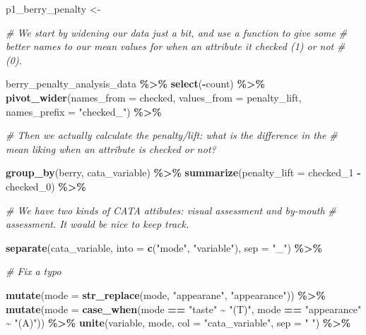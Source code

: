 \documentclass[
]{book}
\newenvironment{Shaded}{\begin{snugshade}}{\end{snugshade}}
\newcommand{\AttributeTok}[1]{\textcolor[rgb]{0.13,0.29,0.53}{#1}}
\newcommand{\CommentTok}[1]{\textcolor[rgb]{0.56,0.35,0.01}{\textit{#1}}}
\newcommand{\FunctionTok}[1]{\textcolor[rgb]{0.13,0.29,0.53}{\textbf{#1}}}
\newcommand{\NormalTok}[1]{#1}
\newcommand{\OtherTok}[1]{\textcolor[rgb]{0.56,0.35,0.01}{#1}}
\newcommand{\SpecialCharTok}[1]{\textcolor[rgb]{0.81,0.36,0.00}{\textbf{#1}}}
\newcommand{\StringTok}[1]{\textcolor[rgb]{0.31,0.60,0.02}{#1}}
\begin{document}
\begin{Shaded}
\begin{Highlighting}[]
\NormalTok{p1\_berry\_penalty }\OtherTok{\textless{}{-}} 
  
  \CommentTok{\# We start by widening our data just a bit, and use a function to give some}
  \CommentTok{\# better names to our mean values for when an attribute it checked (1) or not}
  \CommentTok{\# (0).}
  
\NormalTok{  berry\_penalty\_analysis\_data }\SpecialCharTok{\%\textgreater{}\%}
  \FunctionTok{select}\NormalTok{(}\SpecialCharTok{{-}}\NormalTok{count) }\SpecialCharTok{\%\textgreater{}\%}
  \FunctionTok{pivot\_wider}\NormalTok{(}\AttributeTok{names\_from =}\NormalTok{ checked,}
              \AttributeTok{values\_from =}\NormalTok{ penalty\_lift,}
              \AttributeTok{names\_prefix =} \StringTok{"checked\_"}\NormalTok{) }\SpecialCharTok{\%\textgreater{}\%}
  
  \CommentTok{\# Then we actually calculate the penalty/lift: what is the difference in the}
  \CommentTok{\# mean liking when an attribute is checked or not?}
  
  \FunctionTok{group\_by}\NormalTok{(berry, cata\_variable) }\SpecialCharTok{\%\textgreater{}\%}
  \FunctionTok{summarize}\NormalTok{(}\AttributeTok{penalty\_lift =}\NormalTok{ checked\_1 }\SpecialCharTok{{-}}\NormalTok{ checked\_0) }\SpecialCharTok{\%\textgreater{}\%}
  
  \CommentTok{\# We have two kinds of CATA attibutes: visual assessment and by{-}mouth}
  \CommentTok{\# assessment.  It would be nice to keep track.}
  
  \FunctionTok{separate}\NormalTok{(cata\_variable, }
           \AttributeTok{into =} \FunctionTok{c}\NormalTok{(}\StringTok{"mode"}\NormalTok{, }\StringTok{"variable"}\NormalTok{), }
           \AttributeTok{sep =} \StringTok{"\_"}\NormalTok{) }\SpecialCharTok{\%\textgreater{}\%}
  
  \CommentTok{\# Fix a typo}
  
  \FunctionTok{mutate}\NormalTok{(}\AttributeTok{mode =} \FunctionTok{str\_replace}\NormalTok{(mode, }\StringTok{"appearane"}\NormalTok{, }\StringTok{"appearance"}\NormalTok{)) }\SpecialCharTok{\%\textgreater{}\%}
  \FunctionTok{mutate}\NormalTok{(}\AttributeTok{mode =} \FunctionTok{case\_when}\NormalTok{(mode }\SpecialCharTok{==} \StringTok{"taste"} \SpecialCharTok{\textasciitilde{}} \StringTok{"(T)"}\NormalTok{,}
\NormalTok{                          mode }\SpecialCharTok{==} \StringTok{"appearance"} \SpecialCharTok{\textasciitilde{}} \StringTok{"(A)"}\NormalTok{)) }\SpecialCharTok{\%\textgreater{}\%}
  \FunctionTok{unite}\NormalTok{(variable, mode, }\AttributeTok{col =} \StringTok{"cata\_variable"}\NormalTok{, }\AttributeTok{sep =} \StringTok{" "}\NormalTok{) }\SpecialCharTok{\%\textgreater{}\%}
  

\end{Highlighting}
\end{Shaded}
\end{document}
